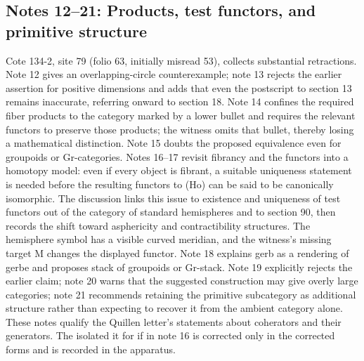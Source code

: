 \subsection*{Notes 12--21: Products, test functors, and primitive structure}
Cote 134-2, site 79 (folio 63, initially misread 53), collects substantial retractions. Note 12 gives an overlapping-circle counterexample; note 13 rejects the earlier assertion for positive dimensions and adds that even the postscript to section 13 remains inaccurate, referring onward to section 18. Note 14 confines the required fiber products to the category marked by a lower bullet and requires the relevant functors to preserve those products; the witness omits that bullet, thereby losing a mathematical distinction. Note 15 doubts the proposed equivalence even for groupoids or Gr-categories. Notes 16--17 revisit fibrancy and the functors into a homotopy model: even if every object is fibrant, a suitable uniqueness statement is needed before the resulting functors to (Ho) can be said to be canonically isomorphic. The discussion links this issue to existence and uniqueness of test functors out of the category of standard hemispheres and to section 90, then records the shift toward asphericity and contractibility structures. The hemisphere symbol has a visible curved meridian, and the witness's missing target M changes the displayed functor. Note 18 explains gerb as a rendering of gerbe and proposes stack of groupoids or Gr-stack. Note 19 explicitly rejects the earlier claim; note 20 warns that the suggested construction may give overly large categories; note 21 recommends retaining the primitive subcategory as additional structure rather than expecting to recover it from the ambient category alone. These notes qualify the Quillen letter's statements about coherators and their generators. The isolated it for if in note 16 is corrected only in the corrected forms and is recorded in the apparatus.


